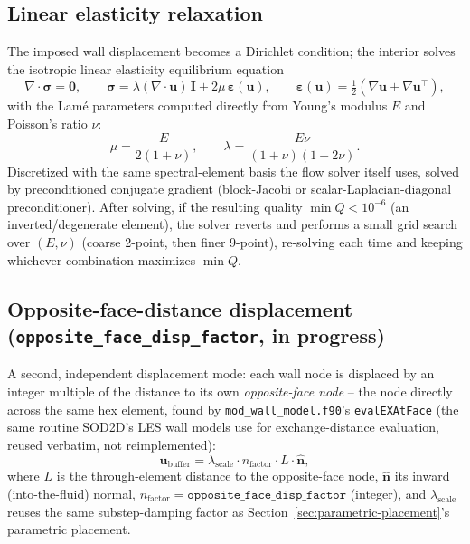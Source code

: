 \documentclass[11pt]{article}
\newcommand{\vecb}[1]{\bm{#1}}
\begin{document}
\subsection{Linear elasticity relaxation}
\label{sec:elasticity-pde}
The imposed wall displacement becomes a Dirichlet condition; the
interior solves the isotropic linear elasticity equilibrium equation
\begin{equation}
\nabla\cdot\vecb{\sigma} = \vecb{0}, \qquad
\vecb{\sigma} = \lambda(\nabla\cdot\vecb{u})\,\vecb{I} + 2\mu\,\vecb{\varepsilon}(\vecb{u}), \qquad
\vecb{\varepsilon}(\vecb{u}) = \tfrac{1}{2}\!\left(\nabla\vecb{u} + \nabla\vecb{u}^{\!\top}\right),
\end{equation}
with the Lam\'e parameters computed directly from Young's modulus
\(E\) and Poisson's ratio \(\nu\):
\begin{equation}
\mu = \frac{E}{2(1+\nu)}, \qquad
\lambda = \frac{E\nu}{(1+\nu)(1-2\nu)} .
\end{equation}
Discretized with the same spectral-element basis the flow solver
itself uses, solved by preconditioned conjugate gradient (block-Jacobi
or scalar-Laplacian-diagonal preconditioner). After solving, if the
resulting quality \(\min Q < 10^{-6}\) (an inverted/degenerate
element), the solver reverts and performs a small grid search over
\((E,\nu)\) (coarse 2-point, then finer 9-point), re-solving each time
and keeping whichever combination maximizes \(\min Q\).

\subsection{Opposite-face-distance displacement (\texttt{opposite\_face\_disp\_factor}, in progress)}
\label{sec:opposite-face}
A second, independent displacement mode: each wall node is displaced by
an integer multiple of the distance to its own \emph{opposite-face
node} -- the node directly across the same hex element, found by
\texttt{mod\_wall\_model.f90}'s \texttt{evalEXAtFace} (the same routine
SOD2D's LES wall models use for exchange-distance evaluation, reused
verbatim, not reimplemented):
\begin{equation}
\vecb{u}_{\text{buffer}} = \lambda_{\text{scale}} \cdot n_{\text{factor}} \cdot L \cdot \hat{\vecb{n}},
\end{equation}
where \(L\) is the through-element distance to the opposite-face node,
\(\hat{\vecb{n}}\) its inward (into-the-fluid) normal, \(n_{\text{factor}}
= \texttt{opposite\_face\_disp\_factor}\) (integer), and
\(\lambda_{\text{scale}}\) reuses the same substep-damping factor as
Section~\ref{sec:parametric-placement}'s parametric placement.
\end{document}
